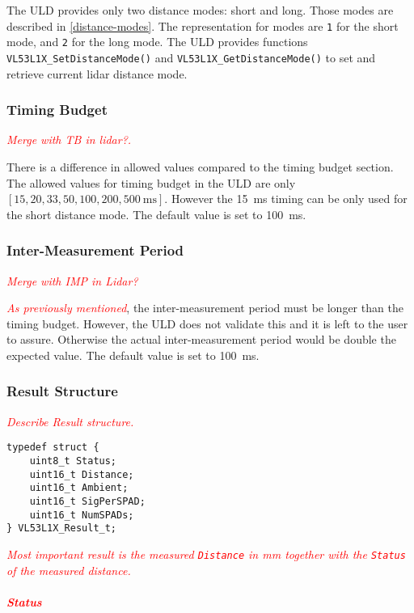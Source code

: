 \documentclass[
  digital,     %
  oneside,     %
  nosansbold,  %
  nocolorbold, %
  lof,         %
  lot,         %
]{fithesis4}
\newcommand{\TODO}[1]{\textcolor{red}{\textit{#1}}}
\begin{document}
The ULD provides only two distance modes: short and long. Those modes are described in \ref{distance-modes}. The representation for modes are \lstinline|1| for the short mode, and \lstinline|2| for the long mode. The ULD provides functions \lstinline|VL53L1X_SetDistanceMode()| and \lstinline|VL53L1X_GetDistanceMode()| to set and retrieve current \acrshort{lidar} distance mode.

\subsubsection{ Timing Budget }
\TODO{Merge with TB in lidar?.}

There is a difference in allowed values compared to the timing budget section. The allowed values for timing budget in the ULD are only $[15, 20,
33, 50, 100, 200, \qty{500}{\milli\second}]$. However the \qty{15}{\milli\second} timing can be only used for the short distance mode. The default value is set to \qty{100}{\milli\second}.

\subsubsection{ Inter-Measurement Period }
\TODO{Merge with IMP in Lidar?}

\TODO{As previously mentioned}, the inter-measurement period must be longer than the timing budget. However, the ULD does not validate this and it is left to the user to assure. Otherwise the actual inter-measurement period would be double the expected value. The default value is set to \qty{100}{\milli\second}.

\subsubsection{ Result Structure }
\TODO{Describe Result structure.}

\begin{lstlisting}
typedef struct {
    uint8_t Status;
    uint16_t Distance;
    uint16_t Ambient;
    uint16_t SigPerSPAD;
    uint16_t NumSPADs;
} VL53L1X_Result_t;
\end{lstlisting}

\TODO{
Most important result is the measured \lstinline|Distance| in \unit{\milli\metre} together with the \lstinline|Status| of the measured distance.
}

\paragraph{\TODO{Status}}
\end{document}
